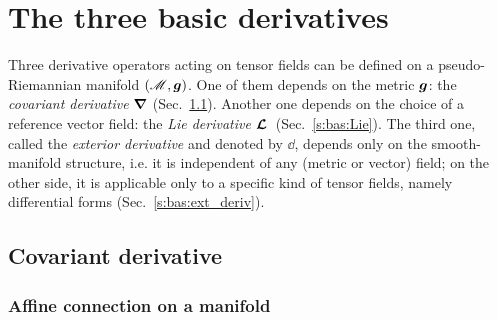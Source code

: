 
\section{The three basic derivatives}

Three derivative operators acting on tensor fields can be defined on a
pseudo-Riemannian manifold $(\mathscr{M},\bm{g})$. One of them depends on the metric $\bm{g}$:
the \emph{covariant derivative} $\bm{\nabla}$ (Sec.~\ref{s:bas:cov_deriv}).
Another one depends on the choice of a
reference vector field: the \emph{Lie derivative} $\bm{\mathcal{L}}_{\bm{}}\,$ (Sec.~\ref{s:bas:Lie}).
The third one, called the \emph{exterior derivative} and denoted by $\dd$, depends only on the smooth-manifold structure, i.e.
it is independent of any (metric or vector) field; on the other side,
it is applicable only to a specific kind of tensor fields, namely differential forms (Sec.~\ref{s:bas:ext_deriv}).


\subsection{Covariant derivative} \label{s:bas:cov_deriv}


\subsubsection{Affine connection on a manifold} \label{s:bas:affine_connect}

